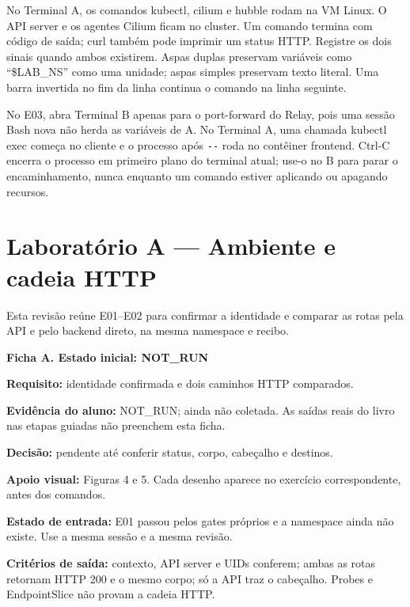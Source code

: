 \documentclass[12pt,openany,oneside,a4paper,chapter=TITLE,english,brazil]{abntex2}
\begin{document}
No Terminal A, os comandos kubectl, cilium e hubble rodam na VM Linux. O API server e os agentes Cilium ficam no cluster. Um comando termina com código de saída; curl também pode imprimir um status HTTP. Registre os dois sinais quando ambos existirem. Aspas duplas preservam variáveis como ``\$LAB\_NS'' como uma unidade; aspas simples preservam texto literal. Uma barra invertida no fim da linha continua o comando na linha seguinte.

No E03, abra Terminal B apenas para o port-forward do Relay, pois uma sessão Bash nova não herda as variáveis de A. No Terminal A, uma chamada kubectl exec começa no cliente e o processo após \texttt{-{}\allowbreak{}-{}\allowbreak{}} roda no contêiner frontend. Ctrl-C encerra o processo em primeiro plano do terminal atual; use-o no B para parar o encaminhamento, nunca enquanto um comando estiver aplicando ou apagando recursos.

\chapter*{Laboratório A — Ambiente e cadeia HTTP}

Esta revisão reúne E01--E02 para confirmar a identidade e comparar as rotas pela API e pelo backend direto, na mesma namespace e recibo.

\begin{mdframed}[linewidth=0.6pt,innertopmargin=6pt,innerbottommargin=6pt]
\small
\textbf{Ficha A. Estado inicial: NOT\_RUN}

\textbf{Requisito:} identidade confirmada e dois caminhos HTTP
comparados.

\textbf{Evidência do aluno:} NOT\_RUN; ainda não coletada. As saídas
reais do livro nas etapas guiadas não preenchem esta ficha.

\textbf{Decisão:} pendente até conferir status, corpo, cabeçalho e
destinos.
\end{mdframed}

\textbf{Apoio visual:} Figuras 4 e 5. Cada desenho aparece no exercício correspondente, antes dos comandos.

\textbf{Estado de entrada:} E01 passou pelos gates próprios e a namespace ainda não existe. Use a mesma sessão e a mesma revisão.

\textbf{Critérios de saída:} contexto, API server e UIDs conferem; ambas as rotas retornam HTTP 200 e o mesmo corpo; só a API traz o cabeçalho. Probes e EndpointSlice não provam a cadeia HTTP.
\end{document}
